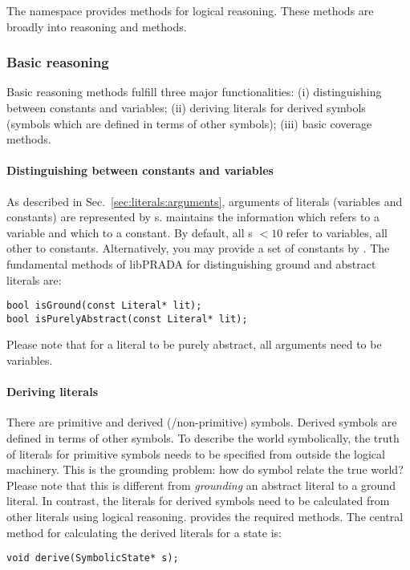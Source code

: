 \documentclass[10pt,twoside,twocolumn,fleqn]{article}
\begin{document}
The namespace  provides methods for logical reasoning. These
methods are broadly into  reasoning and 
methods.


\subsubsection{Basic reasoning}

Basic reasoning methods fulfill three major functionalities: (i)
distinguishing between constants and variables; (ii) deriving literals for
derived symbols (symbols which are defined in terms of other symbols);
(iii) basic coverage methods.


\paragraph{Distinguishing between constants and variables}

As described in Sec.~\ref{sec:literals:arguments}, arguments of literals
(variables and constants) are represented by s. 
maintains the information which  refers to a variable and which
to a constant. By default, all s $<10$ refer to variables, all
other to constants. Alternatively, you may provide a set of constants by
. The fundamental methods of
libPRADA for distinguishing ground and abstract literals are:
\begin{lstlisting}
bool isGround(const Literal* lit);
bool isPurelyAbstract(const Literal* lit);
\end{lstlisting}
Please note that for a literal to be purely abstract, all arguments need
to be variables.

\paragraph{Deriving literals}

There are primitive and derived (/non-primitive) symbols. Derived symbols
are defined in terms of other symbols. To describe the world
symbolically, the truth of literals for primitive symbols needs to be
specified from outside the logical machinery. This is the grounding
problem: how do symbol relate the true world? Please note that this is
different from \emph{grounding} an abstract literal to a ground literal.
In contrast, the literals for derived symbols need to be calculated from
other literals using logical reasoning.  provides the
required methods. The central method for calculating the derived
literals for a state is:
\begin{lstlisting}
void derive(SymbolicState* s);
\end{lstlisting}
\end{document}
